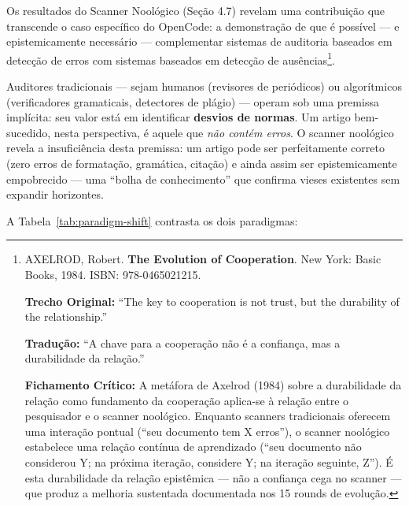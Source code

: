 Os resultados do Scanner Noológico (Seção 4.7) revelam uma contribuição que transcende o caso específico do OpenCode: a demonstração de que é possível --- e epistemicamente necessário --- complementar sistemas de auditoria baseados em detecção de erros com sistemas baseados em detecção de ausências\footnote{
  AXELROD, Robert. \textbf{The Evolution of Cooperation}. New York: Basic Books, 1984. ISBN: 978-0465021215.

  \textbf{Trecho Original:} ``The key to cooperation is not trust, but the durability of the relationship.''

  \textbf{Tradução:} ``A chave para a cooperação não é a confiança, mas a durabilidade da relação.''

  \textbf{Fichamento Crítico:} A metáfora de Axelrod (1984) sobre a durabilidade da relação como fundamento da cooperação aplica-se à relação entre o pesquisador e o scanner noológico. Enquanto scanners tradicionais oferecem uma interação pontual (``seu documento tem X erros''), o scanner noológico estabelece uma relação contínua de aprendizado (``seu documento não considerou Y; na próxima iteração, considere Y; na iteração seguinte, Z''). É esta durabilidade da relação epistêmica --- não a confiança cega no scanner --- que produz a melhoria sustentada documentada nos 15 rounds de evolução.
}.

Auditores tradicionais --- sejam humanos (revisores de periódicos) ou algorítmicos (verificadores gramaticais, detectores de plágio) --- operam sob uma premissa implícita: seu valor está em identificar \textbf{desvios de normas}. Um artigo bem-sucedido, nesta perspectiva, é aquele que \textit{não contém erros}. O scanner noológico revela a insuficiência desta premissa: um artigo pode ser perfeitamente correto (zero erros de formatação, gramática, citação) e ainda assim ser epistemicamente empobrecido --- uma ``bolha de conhecimento'' que confirma vieses existentes sem expandir horizontes.

A Tabela~\ref{tab:paradigm-shift} contrasta os dois paradigmas:

